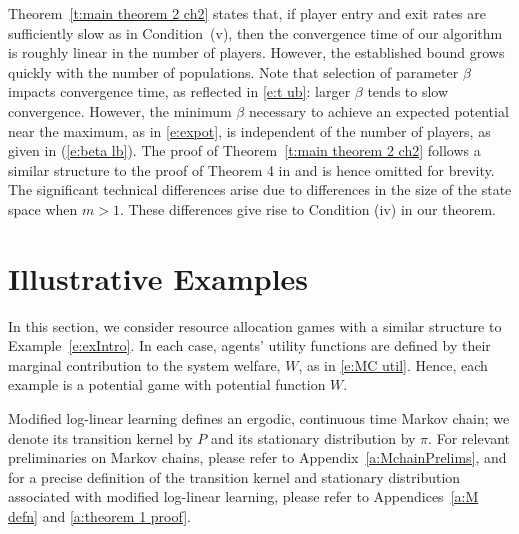 Theorem~\ref{t:main theorem 2 ch2} states that, if player entry and exit rates are sufficiently slow as in Condition~(v), then the convergence time of our algorithm is roughly linear in the number of players. However, the established bound grows quickly with the number of populations. Note that selection of parameter $\beta$ impacts convergence time, as reflected in \eqref{e:t ub}: larger $\beta$ tends to slow convergence. However, the minimum $\beta$ necessary to achieve an expected potential near the maximum, as in \eqref{e:expot}, is independent of the number of players, as given in (\ref{e:beta lb}). The proof of Theorem~\ref{t:main theorem 2 ch2} follows a similar structure to the proof of Theorem 4 in \cite{Shah2010} and is hence omitted for brevity. The significant technical differences arise due to differences in the size of the state space when $m>1$. These differences give rise to Condition (iv) in our theorem. %



\section{Illustrative Examples }\label{s:examples}


In this section, we consider resource allocation games with a similar structure to Example~\ref{e:exIntro}. In each case, agents' utility functions are defined by their marginal contribution to the system welfare, $W$, as in \eqref{e:MC util}. Hence, each example is a potential game with potential function $W$.



Modified log-linear learning defines an ergodic, continuous time Markov chain; we denote its transition kernel by $P$ and its stationary distribution by $\pi.$ For relevant preliminaries on Markov chains, please refer to Appendix~\ref{a:MchainPrelims},  and for a precise definition of the transition kernel and stationary distribution associated with modified log-linear learning, please refer to Appendices~\ref{a:M defn} and \ref{a:theorem 1 proof}. 



